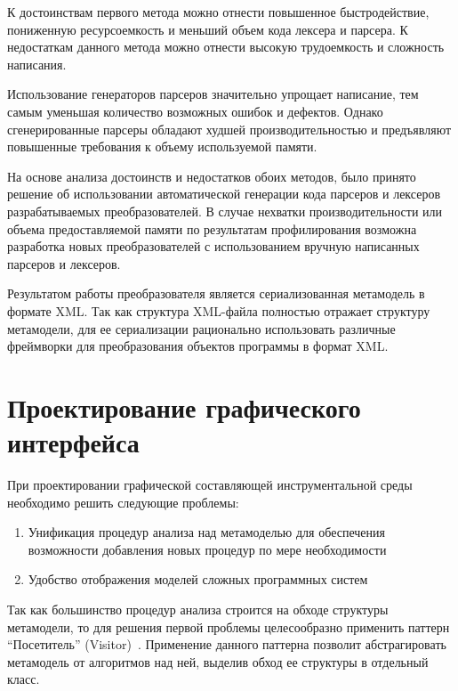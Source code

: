 К достоинствам первого метода можно отнести повышенное быстродействие,
пониженную ресурсоемкость и меньший объем кода лексера и парсера. К недостаткам
данного метода можно отнести высокую трудоемкость и сложность написания.

Использование генераторов парсеров значительно упрощает написание, тем самым
уменьшая количество возможных ошибок и дефектов. Однако сгенерированные парсеры
обладают худшей производительностью и предъявляют повышенные требования к объему
используемой памяти.

На основе анализа достоинств и недостатков обоих методов, было принято решение
об использовании автоматической генерации кода парсеров и лексеров
разрабатываемых преобразователей. В случае нехватки производительности или
объема предоставляемой памяти по результатам профилирования возможна разработка
новых преобразователей с использованием вручную написанных парсеров и лексеров.

Результатом работы преобразователя является сериализованная метамодель в формате
XML. Так как структура XML-файла полностью отражает структуру метамодели, для ее
сериализации рационально использовать различные фреймворки для преобразования
объектов программы в формат XML.

\section{Проектирование графического интерфейса}

При проектировании графической составляющей инструментальной среды необходимо
решить следующие проблемы:

\begin{enumerate}
    \item Унификация процедур анализа над метамоделью для обеспечения
    возможности добавления новых процедур по мере необходимости
    \item Удобство отображения моделей сложных программных систем
\end{enumerate}

Так как большинство процедур анализа строится на обходе структуры метамодели, то
для решения первой проблемы целесообразно применить паттерн ``Посетитель''
(Visitor)~\cite{Gamma94}. Применение данного паттерна позволит абстрагировать
метамодель от алгоритмов над ней, выделив обход ее структуры в отдельный класс.

